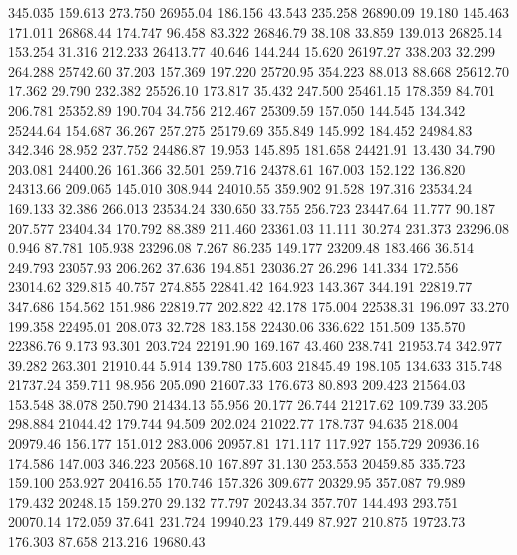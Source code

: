  345.035  159.613  273.750     26955.04
 186.156   43.543  235.258     26890.09
  19.180  145.463  171.011     26868.44
 174.747   96.458   83.322     26846.79
  38.108   33.859  139.013     26825.14
 153.254   31.316  212.233     26413.77
  40.646  144.244   15.620     26197.27
 338.203   32.299  264.288     25742.60
  37.203  157.369  197.220     25720.95
 354.223   88.013   88.668     25612.70
  17.362   29.790  232.382     25526.10
 173.817   35.432  247.500     25461.15
 178.359   84.701  206.781     25352.89
 190.704   34.756  212.467     25309.59
 157.050  144.545  134.342     25244.64
 154.687   36.267  257.275     25179.69
 355.849  145.992  184.452     24984.83
 342.346   28.952  237.752     24486.87
  19.953  145.895  181.658     24421.91
  13.430   34.790  203.081     24400.26
 161.366   32.501  259.716     24378.61
 167.003  152.122  136.820     24313.66
 209.065  145.010  308.944     24010.55
 359.902   91.528  197.316     23534.24
 169.133   32.386  266.013     23534.24
 330.650   33.755  256.723     23447.64
  11.777   90.187  207.577     23404.34
 170.792   88.389  211.460     23361.03
  11.111   30.274  231.373     23296.08
   0.946   87.781  105.938     23296.08
   7.267   86.235  149.177     23209.48
 183.466   36.514  249.793     23057.93
 206.262   37.636  194.851     23036.27
  26.296  141.334  172.556     23014.62
 329.815   40.757  274.855     22841.42
 164.923  143.367  344.191     22819.77
 347.686  154.562  151.986     22819.77
 202.822   42.178  175.004     22538.31
 196.097   33.270  199.358     22495.01
 208.073   32.728  183.158     22430.06
 336.622  151.509  135.570     22386.76
   9.173   93.301  203.724     22191.90
 169.167   43.460  238.741     21953.74
 342.977   39.282  263.301     21910.44
   5.914  139.780  175.603     21845.49
 198.105  134.633  315.748     21737.24
 359.711   98.956  205.090     21607.33
 176.673   80.893  209.423     21564.03
 153.548   38.078  250.790     21434.13
  55.956   20.177   26.744     21217.62
 109.739   33.205  298.884     21044.42
 179.744   94.509  202.024     21022.77
 178.737   94.635  218.004     20979.46
 156.177  151.012  283.006     20957.81
 171.117  117.927  155.729     20936.16
 174.586  147.003  346.223     20568.10
 167.897   31.130  253.553     20459.85
 335.723  159.100  253.927     20416.55
 170.746  157.326  309.677     20329.95
 357.087   79.989  179.432     20248.15
 159.270   29.132   77.797     20243.34
 357.707  144.493  293.751     20070.14
 172.059   37.641  231.724     19940.23
 179.449   87.927  210.875     19723.73
 176.303   87.658  213.216     19680.43
